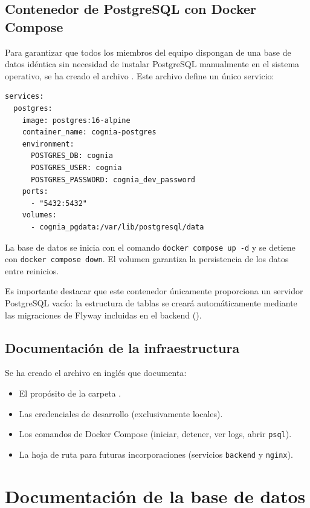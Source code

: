 \documentclass[12pt,a4paper]{report}
\begin{document}
\subsection{Contenedor de PostgreSQL con Docker Compose}

Para garantizar que todos los miembros del equipo dispongan de una base de datos idéntica sin necesidad de instalar PostgreSQL manualmente en el sistema operativo, se ha creado el archivo . Este archivo define un único servicio:

\begin{verbatim}
services:
  postgres:
    image: postgres:16-alpine
    container_name: cognia-postgres
    environment:
      POSTGRES_DB: cognia
      POSTGRES_USER: cognia
      POSTGRES_PASSWORD: cognia_dev_password
    ports:
      - "5432:5432"
    volumes:
      - cognia_pgdata:/var/lib/postgresql/data
\end{verbatim}

La base de datos se inicia con el comando \texttt{docker compose up -d} y se detiene con \texttt{docker compose down}. El volumen  garantiza la persistencia de los datos entre reinicios.

Es importante destacar que este contenedor únicamente proporciona un servidor PostgreSQL vacío: la estructura de tablas se creará automáticamente mediante las migraciones de Flyway incluidas en el backend ().

\subsection{Documentación de la infraestructura}

Se ha creado el archivo  en inglés que documenta:

\begin{itemize}
    \item El propósito de la carpeta .
    \item Las credenciales de desarrollo (exclusivamente locales).
    \item Los comandos de Docker Compose (iniciar, detener, ver logs, abrir \texttt{psql}).
    \item La hoja de ruta para futuras incorporaciones (servicios \texttt{backend} y \texttt{nginx}).
\end{itemize}

\section{Documentación de la base de datos}
\end{document}
